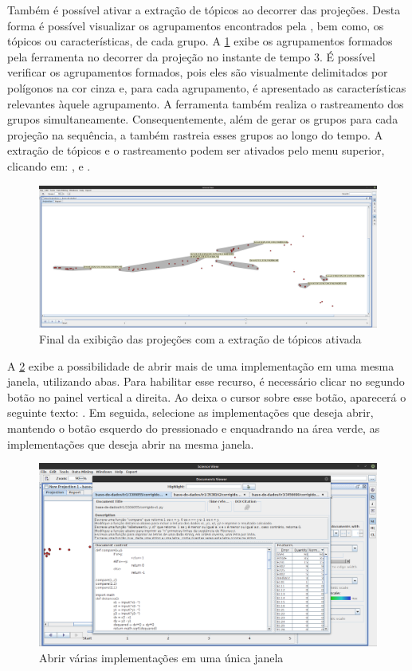 		Também é possível ativar a extração de tópicos ao decorrer das projeções. Desta
		forma é possível visualizar os agrupamentos encontrados pela ,
		bem como, os tópicos ou características, de cada grupo. A \cref{fig:topics3}
		exibe os agrupamentos formados pela ferramenta no decorrer da projeção no instante
		de tempo $3$. É possível verificar os agrupamentos formados, pois eles são
		visualmente delimitados por polígonos  na cor cinza e, para cada agrupamento,
		é apresentado as características relevantes àquele agrupamento. A ferramenta
		também realiza o rastreamento dos grupos simultaneamente. Consequentemente, além
		de gerar os grupos para cada projeção na sequência, a 
		também rastreia esses grupos ao longo do tempo. A extração de tópicos e o
		rastreamento podem ser ativados pelo menu superior, clicando em:
		,  e .
		
		\begin{figure}
			\centering
			\includegraphics[width=0.8\linewidth]{imagem/topics3}
			\caption{Final da exibição das projeções com a extração de tópicos ativada}
			\label{fig:topics3}
		\end{figure}
		
		A \cref{fig:multiplosDoc} exibe a possibilidade de abrir mais de uma implementação
		em uma mesma janela, utilizando abas. Para habilitar esse recurso, é necessário
		clicar no segundo botão no painel vertical a direita. Ao deixa o cursor sobre esse
		botão, aparecerá o seguinte texto: . Em seguida, selecione
		as implementações que deseja abrir, mantendo o botão esquerdo do 
		pressionado e enquadrando na área verde, as implementações que deseja abrir na
		mesma janela.
		
		\begin{figure}
			\centering
			\includegraphics[width=0.7\linewidth]{imagem/multiplosDoc}
			\caption{Abrir várias implementações em uma única janela}
			\label{fig:multiplosDoc}
		\end{figure}
		
